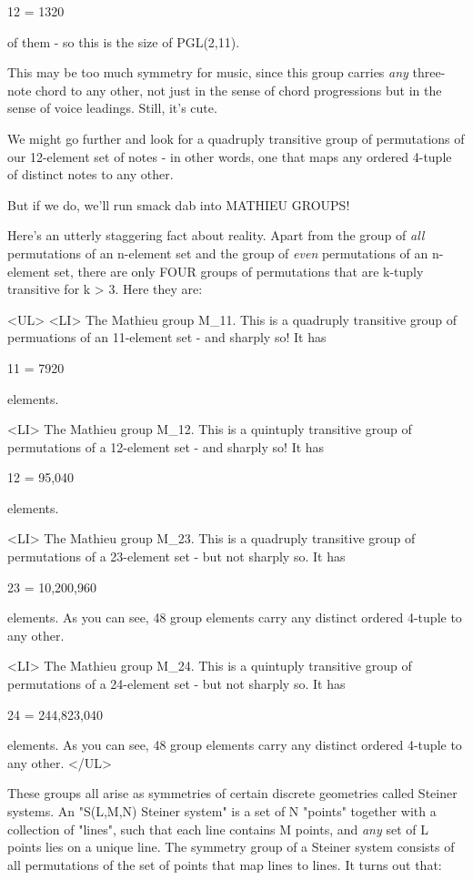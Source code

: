 12   = 1320

of them - so this is the size of PGL(2,11).

This may be too much symmetry for music, since this group carries
\emph{any} three-note chord to any other, not just in the sense of 
chord progressions but in the sense of voice leadings.  Still,
it's cute.

We might go further and look for a quadruply transitive group of
permutations of our 12-element set of notes - in other words, one
that maps any ordered 4-tuple of distinct notes to any other.

But if we do, we'll run smack dab into MATHIEU GROUPS!

Here's an utterly staggering fact about reality.  Apart from the group
of \emph{all} permutations of an n-element set
and the group of \emph{even}
permutations of an n-element set, 
there are only FOUR groups of permutations that are k-tuply
transitive for k > 3.  Here they are:

<UL>
<LI>
The Mathieu group M_{11}.  This is a quadruply transitive group 
of permuations of an 11-element set - and sharply so!  It has

11    = 7920 

elements.

<LI>
The Mathieu group M_{12}.  This is a quintuply transitive group 
of permutations of a 12-element set - and sharply so!  It has 

12     = 95,040

elements.  

<LI>
The Mathieu group M_{23}.  This is a quadruply transitive group
of permutations of a 23-element set - but not sharply so.  It has

23     = 10,200,960

elements.   As you can see, 48 group elements carry any distinct
ordered 4-tuple to any other. 

<LI>
The Mathieu group M_{24}.  This is a quintuply transitive group
of permutations of a 24-element set - but not sharply so.  It has

24      = 244,823,040

elements.   As you can see, 48 group elements carry any distinct
ordered 4-tuple to any other. 
</UL>

These groups all arise as symmetries of certain discrete geometries
called Steiner systems.  An "S(L,M,N) Steiner system" is a
set of N "points" together with a collection of
"lines", such that each line contains M points, and \emph{any}
set of L points lies on a unique line.  The symmetry group of a
Steiner system consists of all permutations of the set of points that
map lines to lines.  It turns out that:

